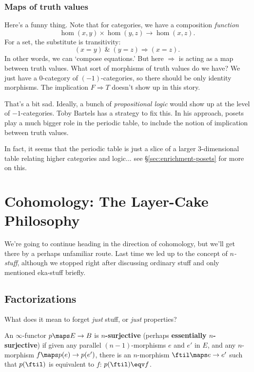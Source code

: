 \documentclass{amsart}
\begin{document}
\subsubsection{Maps of truth values}
\label{sec:maps-truth-values}

Here's a funny thing.
Note that for categories, we have a composition \emph{function}
$$\hom(x,y)\times\hom(y,z)\to \hom(x,z).$$
For a set, the substitute is transitivity:
$$(x=y) \; \& \; (y=z) \Rightarrow (x=z).$$
In other words, we can `compose equations.'
But here $\Rightarrow$ is acting as a map between truth values.
What sort of morphisms of truth values do we have?  We just have a
0-category of $(-1)$-categories, so there should be only identity morphisms.
The implication $F \Rightarrow T$ doesn't show up in this story.

That's a bit sad.  Ideally, a bunch of
\emph{propositional logic} would show up at the level of $-1$-categories.
Toby Bartels has a strategy to fix this.  In his approach, posets
play a much bigger role in the periodic table, to include the
notion of implication between truth values.   

In fact, it seems that the periodic table is just a slice of
a larger 3-dimensional table relating higher categories and logic...
see \S\ref{sec:enrichment-posets} for more on this. 

\section{Cohomology: The Layer-Cake Philosophy}
\label{sec:fact-postn-towers}

We're going to continue heading in the direction of cohomology, but
we'll get there by a perhaps unfamiliar route.  Last time we led up to 
the concept of \emph{$n$-stuff}, although we stopped right after
discussing ordinary stuff and only mentioned eka-stuff briefly.


\subsection{Factorizations}
\label{sec:factorizations}

What does it mean to forget \emph{just} stuff, or \emph{just}
properties?

\begin{defn}
  An $\infty$-functor $p\maps E\to B$ is \textbf{$n$-surjective} (perhaps
  \textbf{essentially $n$-surjective}) if given any parallel
  $(n-1)$-morphisms $e$ and $e'$ in $E$, and any $n$-morphism $f\maps p(e)\to
  p(e')$, there is an $n$-morphism $\ftil\maps e\to e'$ such that $p(\ftil)$
  is equivalent to $f$: $p(\ftil)\eqv f$.   
\end{defn}
\end{document}
